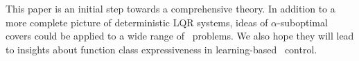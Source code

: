 This paper is an initial step towards a comprehensive theory.
In addition to a more complete picture of deterministic LQR systems,
ideas of $\alpha$-suboptimal covers could be applied to a wide range of \multienv\ problems.
We also hope they will lead to insights
about function class expressiveness in learning-based \multienv\ control.



